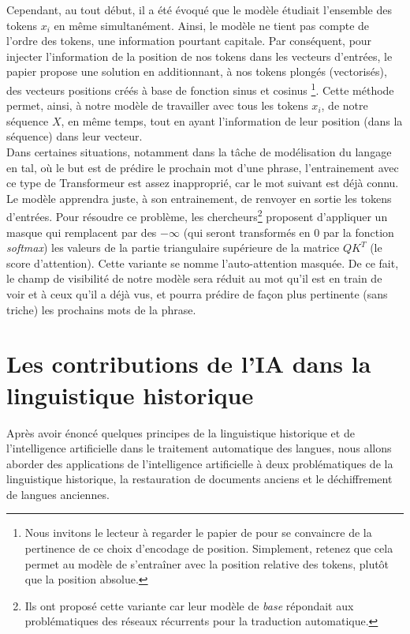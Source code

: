 \documentclass[12pt, twoside]{report}
\begin{document}
Cependant, au tout début, il a été évoqué que le modèle étudiait l'ensemble des tokens $x_i$ en même simultanément. Ainsi, le modèle ne tient pas compte de l'ordre des tokens, une information pourtant capitale. Par conséquent, pour injecter l'information de la position de nos tokens dans les vecteurs d'entrées, le papier \cite{transformer} propose une solution en additionnant, à nos tokens plongés (vectorisés), des vecteurs positions créés à base de fonction sinus et cosinus \footnote{Nous invitons le lecteur à regarder le papier de \autocite{transformer} pour se convaincre de la pertinence de ce choix d'encodage de position. Simplement, retenez que cela permet au modèle de s'entraîner avec la position relative des tokens, plutôt que la position absolue.}. Cette méthode permet, ainsi, à notre modèle de travailler avec tous les tokens $x_i$, de notre séquence $X$, en même temps, tout en ayant l'information de leur position (dans la séquence) dans leur vecteur.\\

Dans certaines situations, notamment dans la tâche de modélisation du langage en \Gls{tal}, où le but est de prédire le prochain mot d'une phrase, l'entrainement avec ce type de Transformeur est assez inapproprié, car le mot suivant est déjà connu. Le modèle apprendra juste, à son entrainement, de renvoyer en sortie les tokens d'entrées. Pour résoudre ce problème, les chercheurs\footnote{Ils ont proposé cette variante car leur modèle de \textit{base} répondait aux problématiques des réseaux récurrents pour la traduction automatique.} proposent d'appliquer un masque qui remplacent par des $-\infty$ (qui seront transformés en 0 par la fonction \textit{softmax}) les valeurs de la partie triangulaire supérieure de la matrice $QK^T$ (le score d'attention). Cette variante se nomme l'auto-attention masquée. De ce fait, le champ de visibilité de notre modèle sera réduit au mot qu'il est en train de voir et à ceux qu'il a déjà vus, et pourra prédire de façon plus pertinente (sans triche) les prochains mots de la phrase.

\chapter{Les contributions de l'IA dans la linguistique historique}

Après avoir énoncé quelques principes de la linguistique historique et de l'intelligence artificielle dans le traitement automatique des langues, nous allons aborder des applications de l'intelligence artificielle à deux problématiques de la linguistique historique, la restauration de documents anciens et le déchiffrement de langues anciennes.
\end{document}
